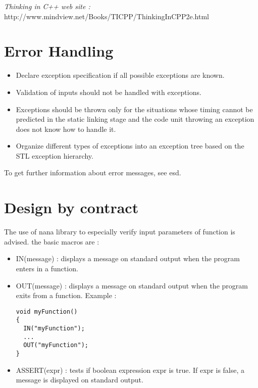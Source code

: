 \documentclass[a4paper,twoside,openright,makeidx,12pt]{report}
\begin{document}
\textit{Thinking in C++ web site :} http://www.mindview.net/Books/TICPP/ThinkingInCPP2e.html



\section{Error Handling}

\begin{itemize}
\item Declare exception specification if all possible exceptions are known.
\item Validation of inputs should not be handled with exceptions.
\item Exceptions should be thrown only for the situations whose timing cannot be predicted in the static linking stage and the code 		unit throwing an exception does not know how to handle it.
\item Organize different types of exceptions into an exception tree based on the STL exception hierarchy.
\end{itemize}
To get further information about error messages, see \ac{esd}.

\section{Design by contract}

The use of nana library to especially verify input parameters of function is advised.
the basic macros are :
\begin{itemize}
\item IN(message) : displays a message on standard output when the program enters in a function.
\item OUT(message) : displays a message on standard output when the program exits from a function.
  Example : \\ 
\begin{verbatim} 
void myFunction()
{
  IN("myFunction");
  ...
  OUT("myFunction");
}                 
\end{verbatim}
\item ASSERT(expr) : tests if boolean expression expr is true. If expr is false, a message is displayed on standard output.
\end{itemize}
\end{document}
